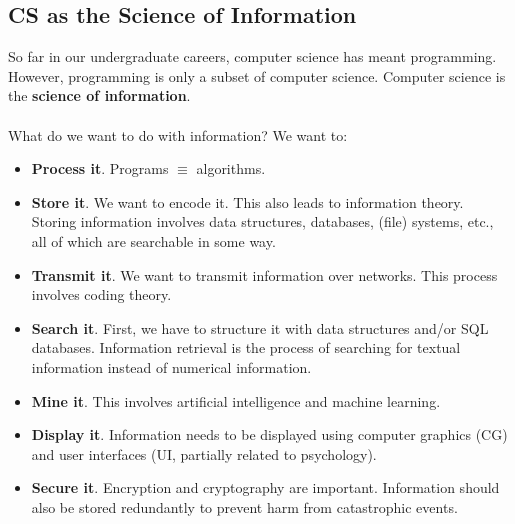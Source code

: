 \documentclass[]{article}
\theoremstyle{definition}
\begin{document}
		\subsection{CS as the Science of Information}
			So far in our undergraduate careers, computer science has meant programming. However, programming is only a subset of computer science. Computer science is the \textbf{science of information}.
			\\ \\
			What do we want to do with information? We want to:
			\begin{itemize}
				\item \textbf{Process it}. Programs $\equiv$ algorithms.
				\item \textbf{Store it}. We want to encode it. This also leads to information theory. Storing information involves data structures, databases, (file) systems, etc., all of which are searchable in some way.
				\item \textbf{Transmit it}. We want to transmit information over networks. This process involves coding theory.
				\item \textbf{Search it}. First, we have to structure it with data structures and/or SQL databases. Information retrieval is the process of searching for textual information instead of numerical information.
				\item \textbf{Mine it}. This involves artificial intelligence and machine learning.
				\item \textbf{Display it}. Information needs to be displayed using computer graphics (CG) and user interfaces (UI, partially related to psychology).
				\item \textbf{Secure it}. Encryption and cryptography are important. Information should also be stored redundantly to prevent harm from catastrophic events.
			\end{itemize}
\end{document}
